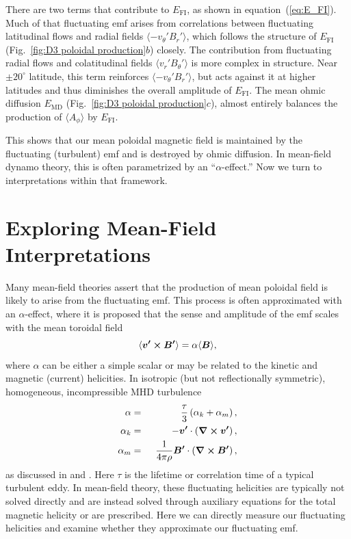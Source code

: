 There are two terms that contribute to $E_\mathrm{FI}$, as shown in equation~(\ref{eq:E_FI}).
Much of that fluctuating emf arises from
correlations between fluctuating latitudinal flows and radial fields
$\langle -v_\theta'B_r' \rangle$, which follows the structure of $E_\mathrm{FI}$
(Fig.~\ref{fig:D3 poloidal production}$b$) closely.  The contribution from
fluctuating radial flows and colatitudinal fields $\langle
v_r'B_\theta'\rangle$ is more complex in structure.  
Near $\pm 20^\circ$ latitude, this term reinforces
$\langle -v_\theta'B_r' \rangle$, but acts against it at
higher latitudes and thus diminishes the overall amplitude of
$E_\mathrm{FI}$. 
The mean ohmic diffusion $E_\mathrm{MD}$ (Fig.~\ref{fig:D3
  poloidal production}$c$), almost entirely balances the production of
$\langle A_\phi \rangle$ by $E_\mathrm{FI}$.

This shows that our mean poloidal magnetic field is maintained by the
fluctuating (turbulent) emf and is destroyed by ohmic diffusion.  In
mean-field dynamo theory, this is often parametrized by an
``$\alpha$-effect.''  Now we turn to interpretations within that framework.

\section{Exploring Mean-Field Interpretations}

Many mean-field theories assert that the production of mean poloidal
field is likely to arise from the fluctuating emf.  This process is often
approximated with an $\alpha$-effect, where it is proposed that the
sense and amplitude of the emf scales with the mean toroidal field
\begin{equation}
  \label{eq:mean field emf}
    \langle \boldsymbol{v'}\boldsymbol{\times}\boldsymbol{B'} \rangle = \alpha \langle \boldsymbol{B} \rangle,
\end{equation}
where $\alpha$ can be either a simple scalar or may be related to the
kinetic and magnetic (current) helicities.  In isotropic (but not
reflectionally symmetric), homogeneous, incompressible MHD turbulence 
\begin{eqnarray}
    \label{eq:mean-field alpha}
    \alpha  &=&\phn\frac{\tau}{3} \left(\alpha_k + \alpha_m \right), \\
    \label{eq:mean-field alpha_k}
    \alpha_k &=& -\vec{v'} \cdot \left(\vec{\del} \cross \vec{v'} \right), \\
    \label{eq:mean-field alpha_m}
    \alpha_m &=& \phn\frac{1}{4\pi\rho} \vec{B'} \cdot \left(\vec{\del} \cross \vec{B'} \right),
\end{eqnarray}
as discussed in \cite{Pouquet_et_al_1976} and \cite{Brandenburg&Subramanian_2005}.
Here $\tau$ is the lifetime or correlation time of a typical turbulent
eddy.  In mean-field theory, these fluctuating helicities are
typically not solved directly and are instead solved through auxiliary
equations for the total magnetic helicity or are prescribed.
Here we can directly measure our fluctuating helicities and examine
whether they approximate our fluctuating emf.


